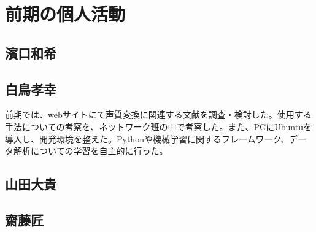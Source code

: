 \section{前期の個人活動}
\subsection{濱口和希}
\par

\subsection{白鳥孝幸}
\par
前期では、webサイトにて声質変換に関連する文献を調査・検討した。使用する手法についての考察を、ネットワーク班の中で考察した。また、PCにUbuntuを導入し、開発環境を整えた。Pythonや機械学習に関するフレームワーク、データ解析についての学習を自主的に行った。

\subsection{山田大貴}

\subsection{齋藤匠}
